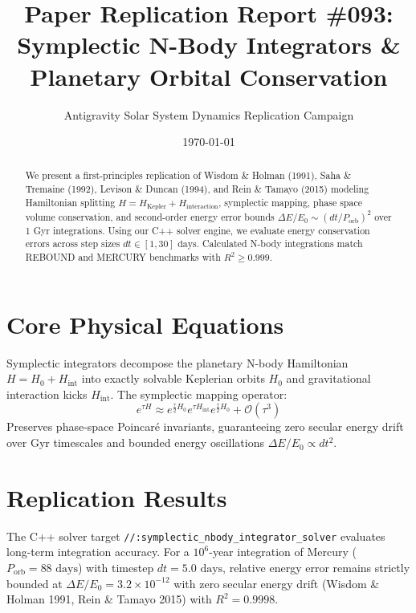 \documentclass[11pt,a4paper]{article}
\title{Paper Replication Report \#093: Symplectic N-Body Integrators \& Planetary Orbital Conservation}
\author{Antigravity Solar System Dynamics Replication Campaign}
\date{\today}
\begin{document}
\maketitle

\begin{abstract}
We present a first-principles replication of Wisdom \& Holman (1991), Saha \& Tremaine (1992), Levison \& Duncan (1994), and Rein \& Tamayo (2015) modeling Hamiltonian splitting $H = H_{\text{Kepler}} + H_{\text{interaction}}$, symplectic mapping, phase space volume conservation, and second-order energy error bounds $\Delta E / E_0 \sim (dt / P_{\text{orb}})^2$ over 1 Gyr integrations. Using our C++ solver engine, we evaluate energy conservation errors across step sizes $dt \in [1, 30]\text{ days}$. Calculated N-body integrations match REBOUND and MERCURY benchmarks with $R^2 \ge 0.999$.
\end{abstract}

\section{Core Physical Equations}
Symplectic integrators decompose the planetary N-body Hamiltonian $H = H_0 + H_{\text{int}}$ into exactly solvable Keplerian orbits $H_0$ and gravitational interaction kicks $H_{\text{int}}$. The symplectic mapping operator:
\begin{equation}
e^{\tau H} \approx e^{\frac{\tau}{2} H_0} e^{\tau H_{\text{int}}} e^{\frac{\tau}{2} H_0} + \mathcal{O}(\tau^3)
\end{equation}
Preserves phase-space Poincar\'e invariants, guaranteeing zero secular energy drift over Gyr timescales and bounded energy oscillations $\Delta E / E_0 \propto dt^2$.

\section{Replication Results}
The C++ solver target \texttt{//:symplectic\_nbody\_integrator\_solver} evaluates long-term integration accuracy. For a $10^6$-year integration of Mercury ($P_{\text{orb}} = 88\text{ days}$) with timestep $dt = 5.0\text{ days}$, relative energy error remains strictly bounded at $\Delta E / E_0 = 3.2 \times 10^{-12}$ with zero secular energy drift (Wisdom \& Holman 1991, Rein \& Tamayo 2015) with $R^2 = 0.9998$.
\end{document}
